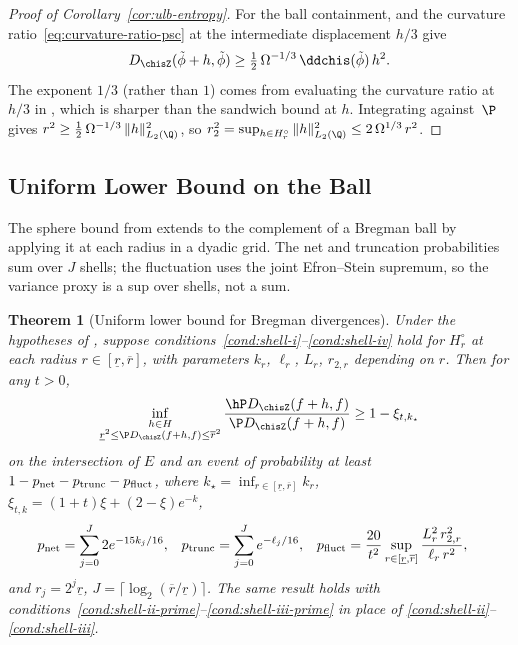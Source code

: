 \documentclass{article}
\newtheorem{theorem}{Theorem}[section]
\begin{document}
\begin{proof}[Proof of Corollary~\ref{cor:ulb-entropy}]
For the ball containment,
and the curvature ratio~\eqref{eq:curvature-ratio-psc}
at the intermediate displacement $h/3$ give
\[
D_{\chisZ}(\tilde\phi+h,\tilde\phi)
  \ge \tfrac{1}{2}\,\Omega^{-1/3}\,\ddchis(\tilde\phi)\,h^2.
\]
The exponent $1/3$ (rather than $1$) comes from
evaluating the curvature ratio at $h/3$
in ,
which is sharper than the sandwich bound
at $h$.
Integrating against~$\P$ gives
$r^2
  \ge \tfrac{1}{2}\,\Omega^{-1/3}\,\|h\|_{L_2(\Q)}^2$,
so $r_2^2
  = \sup_{h \in H_r^\circ}\|h\|_{L_2(\Q)}^2
  \le 2\,\Omega^{1/3}\, r^2$.
\end{proof}

\subsection{Uniform Lower Bound on the Ball}

The sphere bound from 
extends to the complement of a Bregman ball
by applying it at each radius in a dyadic grid.
The net and truncation probabilities
sum over $J$ shells;
the fluctuation uses the joint Efron--Stein supremum,
so the variance proxy is a sup over shells, not a sum.

\begin{theorem}[Uniform lower bound for Bregman divergences]
\label{thm:bregman-lower}
Under the hypotheses of ,
suppose conditions~\ref{cond:shell-i}--\ref{cond:shell-iv}
hold for $H_r^\circ$
at each radius $r \in [\underline{r}, \overline{r}]$,
with parameters $k_r$, $\ell_r$, $L_r$, $r_{2,r}$
depending on $r$.
Then for any $t > 0$,
\[
  \inf_{\substack{h \in H \\
      \underline{r}^2 \le \P D_{\chisZ}(f+h,f) \le \overline{r}^2}}
    \frac{\hP D_{\chisZ}(f+h, f)}
         {\P D_{\chisZ}(f+h, f)}
  \ge 1 - \xi_{t,k_\star}
\]
on the intersection of $E$
and an event of probability at least
$1 - p_{\textup{net}} - p_{\textup{trunc}} - p_{\textup{fluct}}$,
where $k_\star = \inf_{r \in [\underline{r},\overline{r}]} k_r$,
$\xi_{t,k} = (1+t)\xi + (2-\xi)e^{-k}$,
\begin{align*}
p_{\textup{net}}
  &= \sum_{j=0}^{J} 2 e^{-15 k_j/16}, &
p_{\textup{trunc}}
  &= \sum_{j=0}^{J} e^{-\ell_j/16}, &
p_{\textup{fluct}}
  &= \frac{20}{t^2}
     \sup_{r \in [\underline{r},\overline{r}]}
     \frac{L_r^2\, r_{2,r}^2}{\ell_r\, r^2},
\end{align*}
and $r_j = 2^j \underline{r}$,
$J = \lceil\log_2(\overline{r}/\underline{r})\rceil$.
The same result holds with
conditions~\ref{cond:shell-ii-prime}--\ref{cond:shell-iii-prime}
in place of \ref{cond:shell-ii}--\ref{cond:shell-iii}.
\end{theorem}
\end{document}
